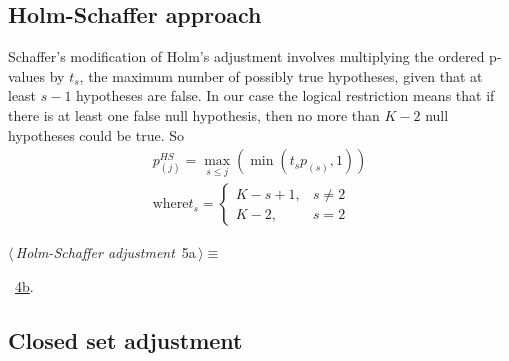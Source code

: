 \documentclass[reqno]{amsart}
\renewcommand{\NWtarget}[2]{\hypertarget{#1}{#2}}
\renewcommand{\NWlink}[2]{\hyperlink{#1}{#2}}
\begin{document}
\subsection{Holm-Schaffer approach}
Schaffer's modification of Holm's adjustment involves multiplying the ordered p-values by $t_s$, the maximum number of possibly true hypotheses, given that at least $s - 1$ hypotheses are false. In our case the logical restriction means that if there is at least one false null hypothesis, then no more than $K-2$ null hypotheses could be true. So
\begin{gather*}
p^{HS}_{(j)} = \max_{s\leq j}(\min( t_s p_{(s)}, 1))\\
\text{where} t_s = \begin{cases}
                   K-s+1, & s\neq 2\\
                   K - 2, & s=2
                  \end{cases}
\end{gather*}


\begin{flushleft} \small\label{scrap6}\raggedright\small
\NWtarget{nuweb5a}{} $\langle\,${\itshape Holm-Schaffer adjustment}\nobreak\ {\footnotesize {5a}}$\,\rangle\equiv$
\vspace{-1ex}
\vspace{-1.5ex}
\footnotesize
\begin{list}{}{\setlength{\itemsep}{-\parsep}\setlength{\itemindent}{-\leftmargin}}
\item \NWtxtMacroRefIn\ \NWlink{nuweb4b}{4b}.

\item{}
\end{list}
\vspace{4ex}
\end{flushleft}
\subsection{Closed set adjustment}
\end{document}
